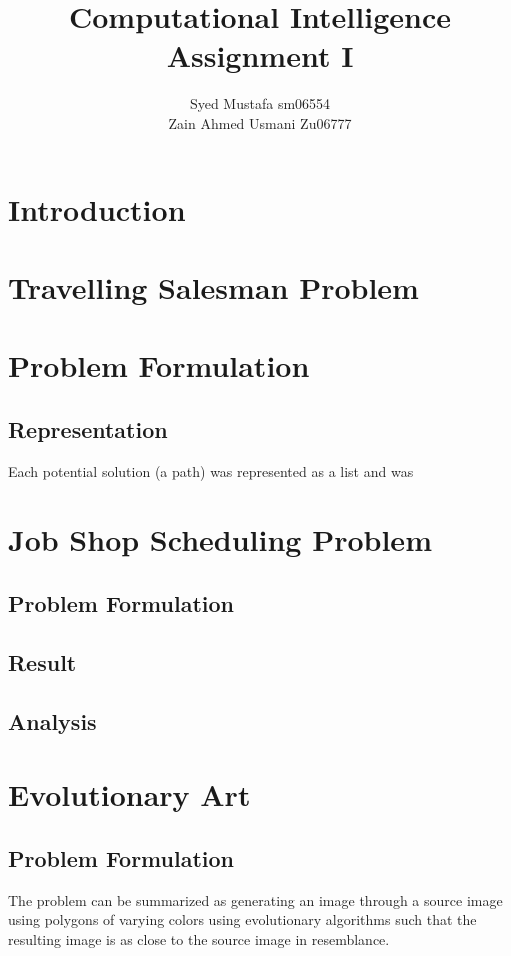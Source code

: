 \documentclass[11pt]{article}
\begin{document}
\title{Computational Intelligence Assignment I}


\author{Syed Mustafa sm06554\\Zain Ahmed Usmani Zu06777}

\maketitle


\section{Introduction}

\section{Travelling Salesman Problem}
\section{Problem Formulation}
\subsection{Representation}
Each potential solution (a path) was represented as a list and was 

\section{Job Shop Scheduling Problem}
\subsection{Problem Formulation}

\subsection{Result}
\subsection{Analysis}

\section{Evolutionary Art}
\subsection{Problem Formulation}
The problem can be summarized as generating an image through a source image using polygons of varying colors using evolutionary algorithms such that the resulting image is as close to the source image in resemblance.
\end{document}
